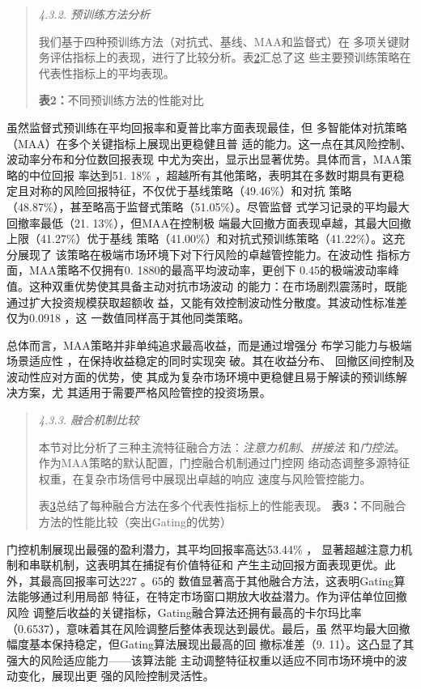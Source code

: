 \begin{quote}
\emph{4.3.2. 预训练方法分析}

我们基于四种预训练方法（对抗式、基线、MAA和监督式）在
多项关键财务评估指标上的表现，进行了比较分析。表\hyperref[bookmark47]{2}汇总了这
些主要预训练策略在代表性指标上的平均表现。

\textbf{表2：}不同预训练方法的性能对比
\end{quote}


虽然监督式预训练在平均回报率和夏普比率方面表现最佳，但
多智能体对抗策略（MAA）在多个关键指标上展现出更稳健且普
适的能力。这一点在其风险控制、波动率分布和分位数回报表现
中尤为突出，显示出显著优势。具体而言，MAA策略的中位回报 率达到51. 18\%
，超越所有其他策略，表明其在多数时期具有更稳
定且对称的风险回报特征，不仅优于基线策略（49.46\%）和对抗
策略（48.87\%），甚至略高于监督式策略（51.05\%）。尽管监督
式学习记录的平均最大回撤率最低（21. 13\%），但MAA在控制极
端最大回撤方面表现卓越，其最大回撤上限（41.27\%）优于基线
策略（41.00\%）和对抗式预训练策略（41.22\%）。这充分展现了
该策略在极端市场环境下对下行风险的卓越管控能力。在波动性
指标方面，MAA策略不仅拥有0. 1880的最高平均波动率，更创下
0.45的极端波动率峰值。这种双重优势使其具备主动对抗市场波动
的能力：在市场剧烈震荡时，既能通过扩大投资规模获取超额收
益，又能有效控制波动性分散度。其波动性标准差仅为0.0918 ，这
一数值同样高于其他同类策略。

总体而言，MAA策略并非单纯追求最高收益，而是通过增强分
布学习能力与极端场景适应性 ，在保持收益稳定的同时实现突
破。其在收益分布、 回撤区间控制及波动性应对方面的优势，使
其成为复杂市场环境中更稳健且易于解读的预训练解决方案，尤
其适用于需要严格风险管控的投资场景。

\begin{quote}
\emph{4.3.3. 融合机制比较}

本节对比分析了三种主流特征融合方法：\emph{注意力机制}、\emph{拼接法}
和\emph{门控法}。作为MAA策略的默认配置，门控融合机制通过门控网
络动态调整多源特征权重，在复杂市场信号中展现出卓越的响应
\protect{}\label{bookmark48}{}速度与风险管控能力。

表\hyperref[bookmark48]{3}总结了每种融合方法在多个代表性指标上的性能表现。
\textbf{表3：}不同融合方法的性能比较（突出Gating的优势）
\end{quote}


门控机制展现出最强的盈利潜力，其平均回报率高达53.44\% ，
显著超越注意力机制和串联机制，这表明其在捕捉有价值特征和
产生主动回报方面表现更优。此外，其最高回报率可达227 。65的
数值显著高于其他融合方法，这表明Gating算法能够通过利用局部
特征，在特定市场窗口期放大收益潜力。作为评估单位回撤风险
调整后收益的关键指标，Gating融合算法还拥有最高的卡尔玛比率
（0.6537），意味着其在风险调整后整体表现达到最优。最后，虽
然平均最大回撤幅度基本保持稳定，但Gating算法展现出最高的回 撤标准差（9.
11）。这凸显了其强大的风险适应能力------该算法能
主动调整特征权重以适应不同市场环境中的波动变化，展现出更
强的风险控制灵活性。

